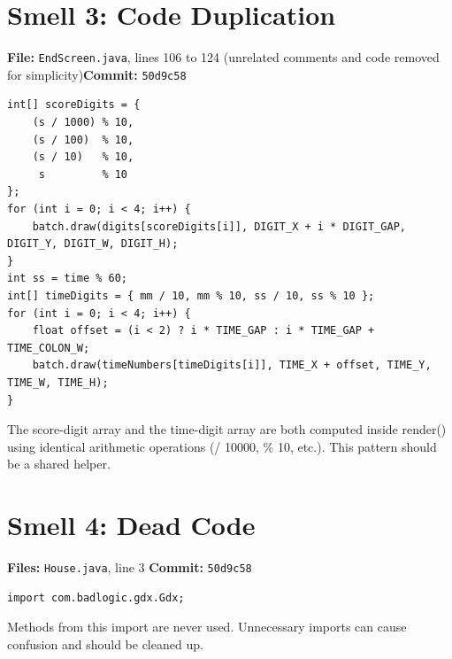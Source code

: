 \documentclass[10pt]{article}
\begin{document}
\section{Smell 3: Code Duplication}

\textbf{File:} \texttt{EndScreen.java}, lines 106 to 124 (unrelated comments and code removed for simplicity)\quad \textbf{Commit:} \texttt{50d9c58}

\begin{lstlisting}
int[] scoreDigits = {
    (s / 1000) % 10,
    (s / 100)  % 10,
    (s / 10)   % 10,
     s         % 10
};
for (int i = 0; i < 4; i++) {
    batch.draw(digits[scoreDigits[i]], DIGIT_X + i * DIGIT_GAP, DIGIT_Y, DIGIT_W, DIGIT_H);
}
int ss = time % 60;
int[] timeDigits = { mm / 10, mm % 10, ss / 10, ss % 10 };
for (int i = 0; i < 4; i++) {
    float offset = (i < 2) ? i * TIME_GAP : i * TIME_GAP + TIME_COLON_W;
    batch.draw(timeNumbers[timeDigits[i]], TIME_X + offset, TIME_Y, TIME_W, TIME_H);
}
\end{lstlisting}

The score-digit array and the time-digit array are both computed inside render() using identical arithmetic operations (/ 10000, \% 10, etc.). This pattern should be a shared helper.

\section{Smell 4: Dead Code}

\textbf{Files:} \texttt{House.java}, line 3\quad
\textbf{Commit:} \texttt{50d9c58}

\begin{lstlisting}
import com.badlogic.gdx.Gdx;
\end{lstlisting}

Methods from this import are never used. Unnecessary imports can cause confusion and should be cleaned up. 
\end{document}
